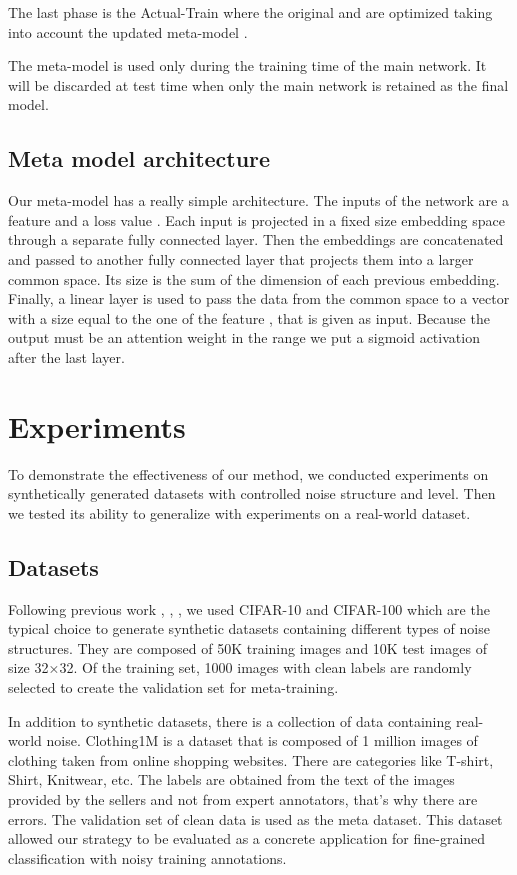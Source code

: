 \documentclass[runningheads]{llncs}
\begin{document}
	The last phase is the Actual-Train where the original  and  are optimized taking into account the updated meta-model .
	
	The meta-model is used only during the training time of the main network. It will be discarded at test time when only the main network is retained as the final model.
	
	\subsection{Meta model architecture}
	
	Our meta-model  has a really simple architecture. The inputs of the network are a feature  and a loss value . Each input is projected in a fixed size embedding space through a separate fully connected layer. Then the embeddings are concatenated and passed to another fully connected layer that projects them into a larger common space. Its size is the sum of the dimension of each previous embedding. Finally, a linear layer is used to pass the data from the common space to a vector with a size equal to the one of the feature , that is given as input. Because the output must be an attention weight in the range  we put a sigmoid activation after the last layer.
	
	
	\section{Experiments}


To demonstrate the effectiveness of our method, we conducted experiments on synthetically generated datasets with controlled noise structure and level. Then we tested its ability to generalize with experiments on a real-world dataset.
	


	
	\subsection{Datasets}
	
	Following previous work \cite{shu2019meta}, \cite{ren2018learning}, \cite{jiang2018mentornet}, we used CIFAR-10 and CIFAR-100 which are the typical choice to generate synthetic datasets containing different types of noise structures. They are composed of 50K training images and 10K test images of size 32×32. Of the training set, 1000 images with clean labels are randomly selected to create the validation set for meta-training.
	
	In addition to synthetic datasets, there is a collection of data containing real-world noise. Clothing1M \cite{xiao2015learning} is a dataset that is composed of 1 million images of clothing taken from online shopping websites. There are  categories like T-shirt, Shirt, Knitwear, etc. The labels are obtained from the text of the images provided by the sellers and not from expert annotators, that's why there are errors. The validation set of  clean data is used as the meta dataset. This dataset allowed our strategy to be evaluated as a concrete application for fine-grained classification with noisy training annotations.
	
\end{document}
